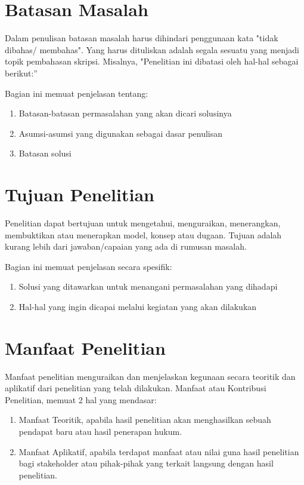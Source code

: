 \section{Batasan Masalah}
\begin{isi}
Dalam penulisan batasan masalah harus dihindari penggunaan kata
"tidak dibahas/ membahas". Yang harus dituliskan adalah segala
sesuatu yang menjadi topik pembahasan skripsi. Misalnya,
"Penelitian ini dibatasi oleh hal-hal sebagai berikut:''

Bagian ini memuat penjelasan tentang:
\begin{enumerate}[label=\alph*., leftmargin=0cm]
  \item Batasan-batasan permasalahan yang akan dicari solusinya
  \item Asumsi-asumsi yang digunakan sebagai dasar penulisan
  \item Batasan solusi
\end{enumerate}
\end{isi}

\section{Tujuan Penelitian}
\begin{isi}
Penelitian dapat bertujuan untuk mengetahui, menguraikan,
menerangkan, membuktikan atau menerapkan model, konsep atau
dugaan. Tujuan adalah kurang lebih dari jawaban/capaian yang ada
di rumusan masalah.

Bagian ini memuat penjelasan secara spesifik:
\begin{enumerate}[label=\alph*., leftmargin=0cm]
  \item Solusi yang ditawarkan untuk menangani permasalahan yang dihadapi
  \item Hal-hal yang ingin dicapai melalui kegiatan yang akan dilakukan
\end{enumerate}
\end{isi}

\section{Manfaat Penelitian}
\begin{isi}
Manfaat penelitian menguraikan dan menjelaskan kegunaan secara
teoritik dan aplikatif dari penelitian yang telah dilakukan.
Manfaat atau Kontribusi Penelitian, memuat 2 hal yang mendasar:
\begin{enumerate}[label=\arabic*., leftmargin=0cm]
  \item Manfaat Teoritik, apabila hasil penelitian akan menghasilkan
        sebuah pendapat baru atau hasil penerapan hukum.
  \item Manfaat Aplikatif, apabila terdapat manfaat atau nilai guna
        hasil penelitian bagi stakeholder atau pihak-pihak yang
        terkait langsung dengan hasil penelitian.
\end{enumerate}
\end{isi}
